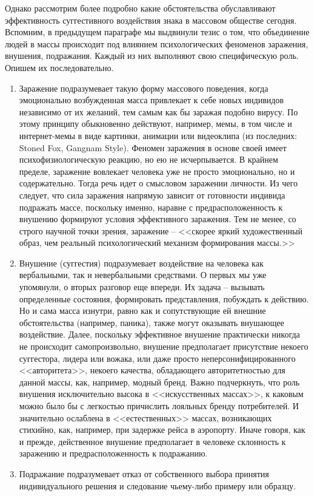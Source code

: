 Однако рассмотрим более подробно какие обстоятельства обуславливают эффективность
суггестивного воздействия знака в массовом обществе сегодня. Вспомним,
в предыдущем параграфе мы выдвинули тезис о том, что объединение людей в массы
происходит под влиянием психологических феноменов заражения, внушения, подражания.
Каждый из них выполняют свою специфическую роль. Опишем их последовательно.
\begin{enumerate}
    \item Заражение подразумевает такую форму массового поведения, когда
    эмоционально возбужденная масса привлекает к себе новых индивидов независимо
    от их желаний, тем самым как бы заражая подобно вирусу.
    \autocite{freid_mass}\autocite{petrovsky1990}\autocite{porshnev1979}\autocite{book:olshansky}
    По этому принципу обыкновенно действуют, например, мемы, в том числе и интернет-мемы в
    виде картинки, анимации или видеоклипа (из последних: Stoned Fox, Gangnam Style). Феномен заражения в
    основе своей имеет психофизиологическую реакцию, но ею не исчерпывается.
    В крайнем пределе, заражение вовлекает человека уже не просто эмоционально,
    но и содержательно. Тогда речь идет о смысловом заражении личности.
    Из чего следует, что сила заражения напрямую зависит от готовности индивида
    подражать массе, поскольку именно, наравне с предрасположенность к внушению
    формируют условия эффективного заражения. Тем не менее, со строго научной точки
    зрения, заражение -- <<скорее яркий художественный образ, чем реальный
    психологический механизм формирования массы.>>\autocite[][86]{book:olshansky}

    \item Внушение (суггестия) подразумевает воздействие на человека как вербальными,
    так и невербальными средствами. О первых мы уже упомянули, о вторых разговор еще
    впереди. Их задача -- вызывать определенные состояния, формировать представления,
    побуждать к действию. Но и сама масса изнутри, равно как и сопутствующие ей
    внешние обстоятельства (например, паника), также могут оказывать внушающее
    воздействие.\autocite{behterev1898}\autocite{porshnev1979} Далее, поскольку эффективное
    внушение практически никогда не происходит самопроизвольно, внушение предполагает
    присутствие некоего суггестора, лидера или вожака, или даже просто
    неперсонифицированного <<авторитета>>, некоего качества, обладающего
    авторитетностью для данной массы, как, например, модный бренд.
    Важно подчеркнуть, что роль внушения исключительно высока в <<искусственных массах>>\autocite[][69]{freid_mass}, к каковым можно было
    бы с легкостью причислить лояльных бренду потребителей. И значительно
    ослаблена в <<естественных>> массах, возникающих стихийно, как, например,
    при задержке рейса в аэропорту. Иначе говоря, как и прежде, действенное внушение
    предполагает в человеке склонность к заражению и предрасположенность к подражанию.

    \item Подражание подразумевает отказ от собственного выбора принятия
    индивидуального решения и следование чьему-либо примеру или образцу.
\end{enumerate}
